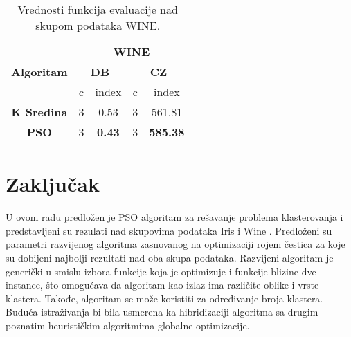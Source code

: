 \documentclass[a4paper,serbian]{symopissr}
\begin{document}
\begin{table}[]
\begin{tabular}{|l|c|c|c|c|}
\hline
\multirow{3}{*}{\textbf{Algoritam}}      & \multicolumn{4}{c|}{\textbf{WINE}}                                        \\ \cline{2-5} 
                                         & \multicolumn{2}{c|}{\textbf{DB}} & \multicolumn{2}{c|}{\textbf{CZ}} \\ \cline{2-5} 
                                         & c         & index                & c & index                                \\ \hline
\multicolumn{1}{|c|}{\textbf{K Sredina}} & 3         & 0.53                & 3 & 561.81                               \\ \hline
\multicolumn{1}{|c|}{\textbf{PSO}}       & 3         & \textbf{0.43}        & 3 & \multicolumn{1}{l|}{\textbf{585.38}} \\ \hline
\end{tabular}
\caption{\label{tab:wine}Vrednosti funkcija evaluacije nad skupom podataka WINE.}
\end{table}

\section{Zaključak}
\label{sec:zakljucak}
U ovom radu predložen je PSO algoritam za rešavanje problema klasterovanja i predstavljeni su rezulati nad skupovima podataka Iris \cite{iris} i Wine \cite{uci_wine}. Predloženi su parametri razvijenog algoritma zasnovanog na optimizaciji rojem čestica za koje su dobijeni najbolji rezultati nad oba skupa podataka. Razvijeni algoritam je generički u smislu izbora funkcije koja je optimizuje i funkcije blizine dve instance, što omogućava da algoritam kao izlaz ima različite oblike i vrste klastera. Takođe, algoritam se može koristiti za određivanje broja klastera.\\
Buduća istraživanja bi bila usmerena ka hibridizaciji algoritma sa drugim poznatim heurističkim algoritmima globalne optimizacije.

\end{document}
